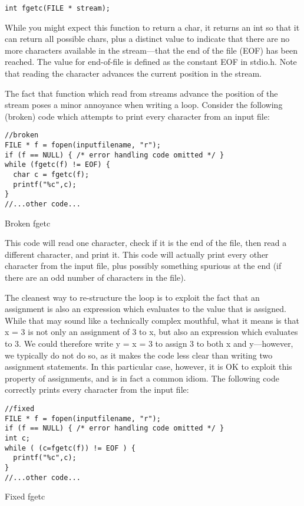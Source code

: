 \documentclass[11pt, a4paper]{article}
\begin{document}
\texttt{int fgetc(FILE * stream);} 



While you might expect this function to return a char, it returns an int so that it can return all possible chars, plus a distinct value to indicate that there are no more characters available in the stream—that the end of the file (EOF) has been reached. The value for end-of-file is defined as the constant EOF in stdio.h. Note that reading the character advances the current position in the stream.



The fact that function which read from streams advance the position of the stream poses a minor annoyance when writing a loop. Consider the following (broken) code which attempts to print every character from an input file:



\begin{listing}
\begin{verbatim}
//broken
FILE * f = fopen(inputfilename, "r");
if (f == NULL) { /* error handling code omitted */ }
while (fgetc(f) != EOF) {
  char c = fgetc(f);
  printf("%c",c);
}
//...other code...
\end{verbatim}
\caption{Broken fgetc}
\label{lst:broken_fgetc}
\end{listing}


This code will read one character, check if it is the end of the file, then read a different character, and print it. This code will actually print every other character from the input file, plus possibly something spurious at the end (if there are an odd number of characters in the file).


The cleanest way to re-structure the loop is to exploit the fact that an assignment is also an expression which evaluates to the value that is assigned. While that may sound like a technically complex mouthful, what it means is that x = 3 is not only an assignment of 3 to x, but also an expression which evaluates to 3. We could therefore write y = x = 3 to assign 3 to both x and y—however, we typically do not do so, as it makes the code less clear than writing two assignment statements. In this particular case, however, it is OK to exploit this property of assignments, and is in fact a common idiom. The following code correctly prints every character from the input file:


\begin{listing}
\begin{verbatim}
//fixed
FILE * f = fopen(inputfilename, "r");
if (f == NULL) { /* error handling code omitted */ }
int c;
while ( (c=fgetc(f)) != EOF ) {
  printf("%c",c);
}
//...other code...
\end{verbatim}
\caption{Fixed fgetc}
\label{lst:fixed_fgetc}
\end{listing}
\end{document}
